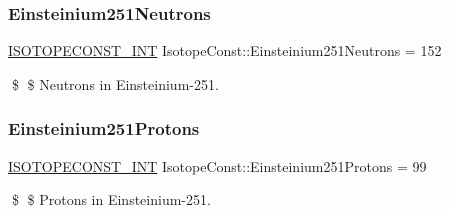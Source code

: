 \subsubsection{\texorpdfstring{Einsteinium251\+Neutrons}{Einsteinium251Neutrons}}
{\footnotesize\ttfamily \mbox{\hyperlink{group___isotope_const-_macros_ga5f18360b3e99483a35c32d789e62621c}{I\+S\+O\+T\+O\+P\+E\+C\+O\+N\+S\+T\+\_\+\+I\+NT}} Isotope\+Const\+::\+Einsteinium251\+Neutrons = 152}

\$ \$ Neutrons in Einsteinium-\/251. \mbox{\label{group___isotope_const-_einsteinium-_es251_gae09d1b24960eef2f6bd5df84e39edf5e}} 
\subsubsection{\texorpdfstring{Einsteinium251\+Protons}{Einsteinium251Protons}}
{\footnotesize\ttfamily \mbox{\hyperlink{group___isotope_const-_macros_ga5f18360b3e99483a35c32d789e62621c}{I\+S\+O\+T\+O\+P\+E\+C\+O\+N\+S\+T\+\_\+\+I\+NT}} Isotope\+Const\+::\+Einsteinium251\+Protons = 99}

\$ \$ Protons in Einsteinium-\/251. 